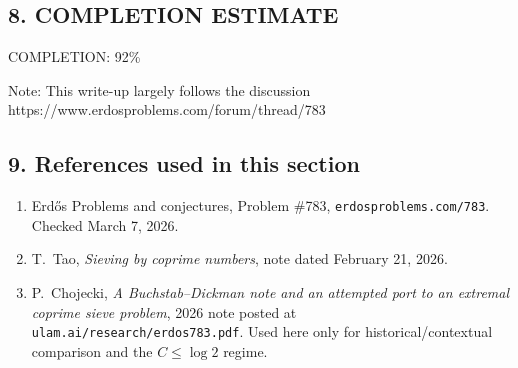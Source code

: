 \subsection*{8. COMPLETION ESTIMATE}

COMPLETION: 92\%

Note: This write-up largely follows the discussion https://www.erdosproblems.com/forum/thread/783

\subsection*{9. References used in this section}

\begin{enumerate}
\item[\textbf{[EP783]}] Erd\H{o}s Problems and conjectures, Problem \#783, \texttt{erdosproblems.com/783}. Checked March 7, 2026.
\item[\textbf{[Tao26]}] T.~Tao, \emph{Sieving by coprime numbers}, note dated February 21, 2026.
\item[\textbf{[Choj26]}] P.~Chojecki, \emph{A Buchstab--Dickman note and an attempted port to an extremal coprime sieve problem}, 2026 note posted at \texttt{ulam.ai/research/erdos783.pdf}. Used here only for historical/contextual comparison and the $C\leq \log 2$ regime.
\end{enumerate}
